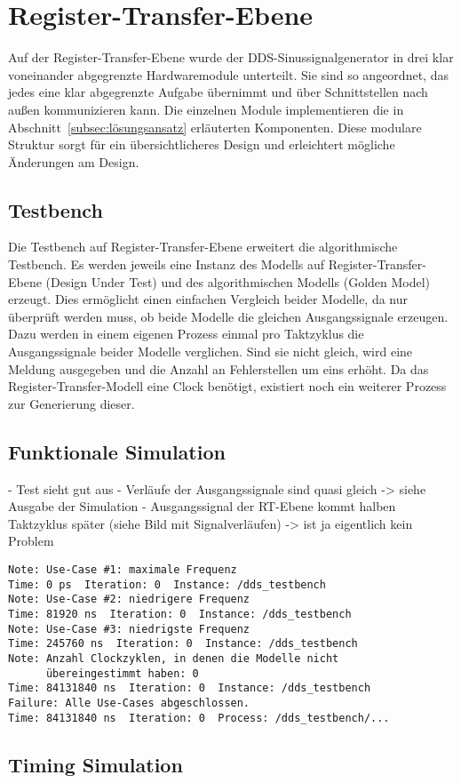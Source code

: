 \section{Register-Transfer-Ebene}
\label{sec:rt_ebene}
Auf der Register-Transfer-Ebene wurde der DDS-Sinussignalgenerator in drei klar voneinander abgegrenzte Hardwaremodule unterteilt.
Sie sind so angeordnet, das jedes eine klar abgegrenzte Aufgabe übernimmt und über Schnittstellen nach außen kommunizieren kann.
Die einzelnen Module implementieren die in Abschnitt~\ref{subsec:lösungsansatz} erläuterten Komponenten.
Diese modulare Struktur sorgt für ein übersichtlicheres Design und erleichtert mögliche Änderungen am Design.

\subsection{Testbench}
\label{subsec:tb_rt}
Die Testbench auf Register-Transfer-Ebene erweitert die algorithmische Testbench.
Es werden jeweils eine Instanz des Modells auf Register-Transfer-Ebene (Design Under Test) und des algorithmischen Modells (Golden Model) erzeugt.
Dies ermöglicht einen einfachen Vergleich beider Modelle, da nur überprüft werden muss, ob beide Modelle die gleichen Ausgangssignale erzeugen.
Dazu werden in einem eigenen Prozess einmal pro Taktzyklus die Ausgangssignale beider Modelle verglichen.
Sind sie nicht gleich, wird eine Meldung ausgegeben und die Anzahl an Fehlerstellen um eins erhöht.
Da das Register-Transfer-Modell eine Clock benötigt, existiert noch ein weiterer Prozess zur Generierung dieser. 

\subsection{Funktionale Simulation}
- Test sieht gut aus
- Verläufe der Ausgangssignale sind quasi gleich
-> siehe Ausgabe der Simulation
- Ausgangssignal der RT-Ebene kommt halben Taktzyklus später (siehe Bild mit Signalverläufen)
-> ist ja eigentlich kein Problem
\label{subsec:sim_func_rt}
\begin{verbatim}
Note: Use-Case #1: maximale Frequenz
Time: 0 ps  Iteration: 0  Instance: /dds_testbench
Note: Use-Case #2: niedrigere Frequenz
Time: 81920 ns  Iteration: 0  Instance: /dds_testbench
Note: Use-Case #3: niedrigste Frequenz
Time: 245760 ns  Iteration: 0  Instance: /dds_testbench
Note: Anzahl Clockzyklen, in denen die Modelle nicht 
      übereingestimmt haben: 0
Time: 84131840 ns  Iteration: 0  Instance: /dds_testbench
Failure: Alle Use-Cases abgeschlossen.
Time: 84131840 ns  Iteration: 0  Process: /dds_testbench/...  
\end{verbatim}

\subsection{Timing Simulation}
\label{subsec:sim_timing_rt}